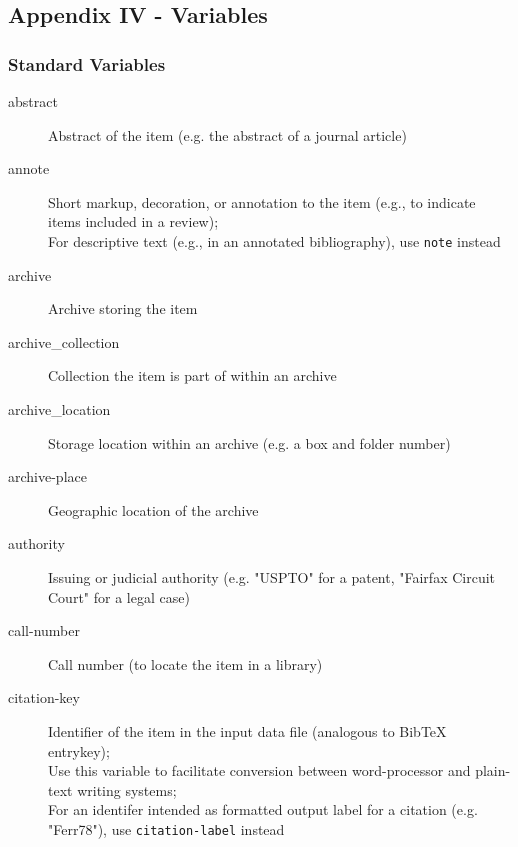 \hypertarget{appendix-iv---variables}{%
\subsection{Appendix IV - Variables}\label{appendix-iv---variables}}

\hypertarget{standard-variables}{%
\subsubsection{Standard Variables}\label{standard-variables}}

\begin{description}

  \item[abstract]
    Abstract of the item (e.g. the abstract of a journal article)

  \item[annote]
    Short markup, decoration, or annotation to the item (e.g., to indicate
    items included in a review);\\
    For descriptive text (e.g., in an annotated bibliography), use
    \texttt{note} instead

  \item[archive]
    Archive storing the item

  \item[archive\_collection]
    Collection the item is part of within an archive

  \item[archive\_location]
    Storage location within an archive (e.g. a box and folder number)

  \item[archive-place]
    Geographic location of the archive

  \item[authority]
    Issuing or judicial authority (e.g. "USPTO" for a patent, "Fairfax
    Circuit Court" for a legal case)

  \item[call-number]
    Call number (to locate the item in a library)

  \item[citation-key]
    Identifier of the item in the input data file (analogous to BibTeX
    entrykey);\\
    Use this variable to facilitate conversion between word-processor and
    plain-text writing systems;\\
    For an identifer intended as formatted output label for a citation (e.g.
    "Ferr78"), use \texttt{citation-label} instead


\end{description}
